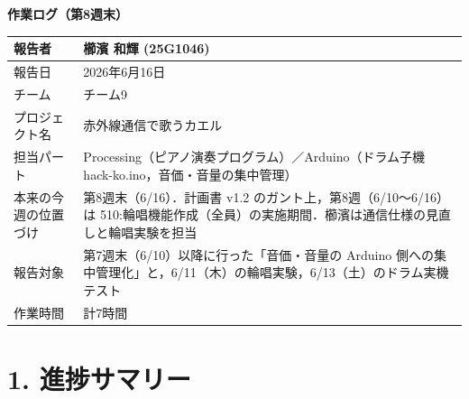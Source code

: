 \documentclass[a4paper,11pt]{ltjsarticle}
\providecommand{\％}{\%}
\begin{document}
\begin{center}
    {\LARGE \textbf{作業ログ（第8週末）}}\\[1em]
\end{center}

\begin{tabular}{|p{4cm}|p{10cm}|}
\hline
報告者 & 櫛濱 和輝 (25G1046)\\
\hline
報告日 & 2026年6月16日\\
\hline
チーム & チーム9\\
\hline
プロジェクト名 & 赤外線通信で歌うカエル\\
\hline
担当パート & Processing（ピアノ演奏プログラム）／Arduino（ドラム子機 hack-ko.ino，音価・音量の集中管理）\\
\hline
本来の今週の位置づけ & 第8週末（6/16）．計画書 v1.2 のガント上，第8週（6/10〜6/16）は 510:輪唱機能作成（全員）の実施期間．櫛濱は通信仕様の見直しと輪唱実験を担当\\
\hline
報告対象 & 第7週末（6/10）以降に行った「音価・音量の Arduino 側への集中管理化」と，6/11（木）の輪唱実験，6/13（土）のドラム実機テスト\\
\hline
作業時間 & 計7時間\\
\hline
\end{tabular}

\vspace{1em}

\section{1. 進捗サマリー}
\end{document}
